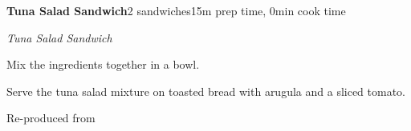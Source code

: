 \documentclass[../recipe-collections/cooking.tex]{subfiles}
\begin{document}
\begin{recipe}{\textbf{Tuna Salad Sandwich}}{2 sandwiches}{15m prep time, 0min cook time}
  
  \freeform{}\textit{Tuna Salad Sandwich}


  Mix the ingredients together in a bowl.


  Serve the tuna salad mixture on toasted bread with arugula and a sliced tomato.

  
  \freeform{}\hrulefill{}

\end{recipe}

Re-produced from  \autocite{mentaloutlaw_2021}
\end{document}
